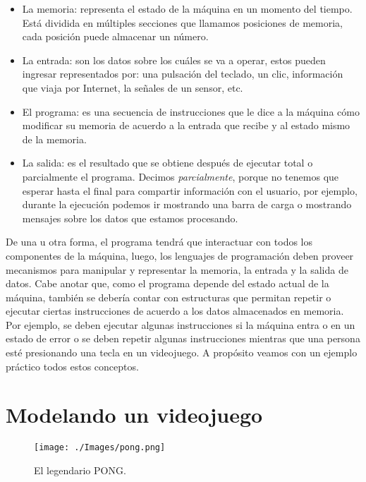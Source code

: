 \begin{itemize}
\item La memoria: representa el estado de la máquina en un momento del tiempo. Está dividida en múltiples secciones que llamamos posiciones de memoria, cada posición puede almacenar un número.

\item La entrada: son los datos sobre los cuáles se va a operar, estos pueden ingresar representados por: una pulsación del teclado, un clic, información que viaja por Internet, la señales de un sensor, etc.
 
\item El programa: es una secuencia de instrucciones que le dice a la máquina cómo modificar su memoria de acuerdo a la entrada que recibe y al estado mismo de la memoria. 

\item La salida: es el resultado que se obtiene después de ejecutar total o parcialmente el programa. Decimos \emph{parcialmente}, porque no tenemos que esperar hasta el final para compartir información con el usuario, por ejemplo, durante la ejecución podemos ir mostrando una barra de carga o mostrando mensajes sobre los datos que estamos procesando.
\end{itemize}



De una u otra forma, el programa tendrá que interactuar con todos los componentes de la máquina, luego, los lenguajes de programación deben proveer mecanismos para manipular y representar la memoria, la entrada y la salida de datos. Cabe anotar que, como el programa depende del estado actual de la máquina, también se debería contar con estructuras que permitan repetir o ejecutar ciertas instrucciones de acuerdo a los datos almacenados en memoria. Por ejemplo, se deben ejecutar algunas instrucciones si la máquina entra o en un estado de error o se deben repetir algunas instrucciones mientras que una persona esté presionando una tecla en un videojuego. A propósito veamos con un ejemplo práctico todos estos conceptos.


\section{Modelando un videojuego}


\begin{figure}[h!]
	\centering
	\texttt{[image: ./Images/pong.png]}
	\caption{El legendario PONG.}
	\label{figpong}
\end{figure}

